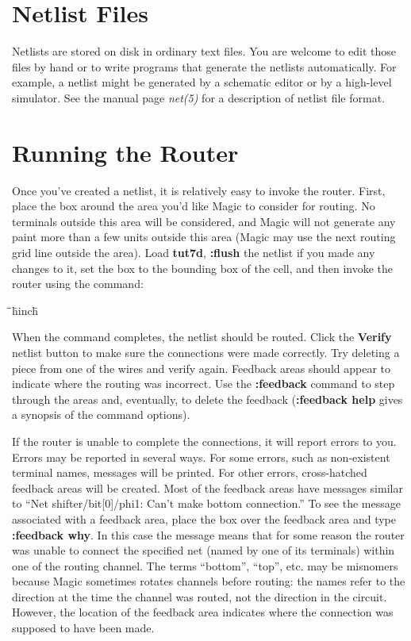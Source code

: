 \documentclass[letterpaper,twoside,12pt]{article}
\def\hinch{\hspace*{0.5in}}
\def\starti{\begin{center}\begin{tabbing}\hinch\=\hinch\=\hinch\=hinch\hinch\=\kill}
\def\endi{\end{tabbing}\end{center}}
\def\ii{\>\>\>}
\begin{document}
\section{Netlist Files}

Netlists are stored on disk in ordinary text files.
You are welcome to edit those files by hand or to
write programs that generate the netlists automatically.
For example, a netlist might be generated by a schematic
editor or by a high-level simulator.  See the manual page
{\itshape net(5)} for a description of netlist file format.


\section{Running the Router}

Once you've created a netlist, it is relatively easy to invoke
the router.  First, place the box around the area you'd like
Magic to consider for routing.  No terminals outside this area
will be considered, and Magic will not generate any paint more than
a few units outside this area (Magic may use the next routing
grid line outside the area).  Load {\bfseries tut7d}, {\bfseries :flush} the
netlist if you made any changes to it, set the box to the bounding
box of the cell, and then invoke the router using the command:

\starti
   \ii {\bfseries :route}
\endi

When the command completes, the netlist should be routed.
Click the {\bfseries Verify} netlist button to make sure the connections
were made correctly.  Try deleting a piece from one of the
wires and verify again.  Feedback areas should appear to
indicate where the routing was incorrect.  Use the {\bfseries :feedback}
command to step through the areas and, eventually, to delete
the feedback ({\bfseries :feedback help} gives a synopsis of the command
options).

If the router is unable to complete the connections, it will
report errors to you.
Errors may be reported in several ways.  For some
errors, such as non-existent terminal names, messages will
be printed.  For other errors, cross-hatched feedback
areas will be created.  Most of the feedback areas have
messages similar to ``Net shifter/bit[0]/phi1: Can't make
bottom connection.''  To see the message associated with a feedback
area, place the box over the feedback area and type {\bfseries :feedback why}.
In this case the message means that for some
reason the router was unable to connect the specified net (named
by one of its terminals) within one of the routing channel.  The
terms ``bottom'', ``top'', etc. may be misnomers because Magic
sometimes rotates channels before routing:  the names refer to the
direction at the time the channel was routed, not the direction in
the circuit.  However, the location of the feedback area indicates
where the connection was supposed to have been made.
\end{document}

